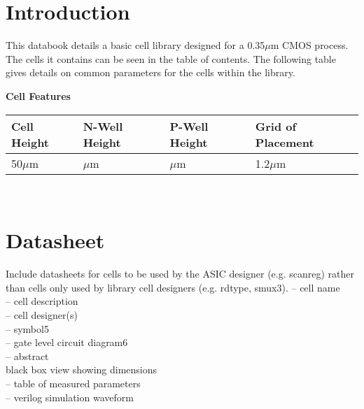 \documentclass[11pt,a4paper]{article} %
\begin{document}
 \newpage 
\section{Introduction}


This databook details a basic cell library designed for a 0.35$\mu$m CMOS process. The cells it contains can be seen in the table of contents. The following table gives details on common parameters for the cells within the library.

\begin{center}
\textbf{Cell Features}\\[0.2cm]

    \begin{tabular}{|l|l|l|l|}
    \hline
    Cell Height      &  N-Well Height & P-Well Height & Grid of Placement \\ \hline \hline
      50$\mu$m & $\mu$m & $\mu$m & 1.2$\mu$m        \\ \hline
    \end{tabular}\\[0.5cm]


\end{center}




 \newpage 
\section{Datasheet} %

Include datasheets for cells to be used by the ASIC designer (e.g. scanreg)
rather than cells only used by library cell designers (e.g. rdtype, smux3).
– cell name\\
– cell description\\
– cell designer(s)\\
– symbol5\\
– gate level circuit diagram6\\
– abstract\\
black box view showing dimensions\\
– table of measured parameters\\
– verilog simulation waveform\\
\end{document}
